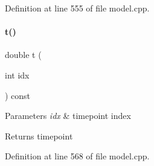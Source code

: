 Definition at line 555 of file model.\+cpp.

\mbox{\label{classamici_1_1_model_a711281d57e9710226face29151cc4641}} 
\paragraph{\texorpdfstring{t()}{t()}}
{\footnotesize\ttfamily double t (\begin{DoxyParamCaption}\item[{int}]{idx }\end{DoxyParamCaption}) const}


\begin{DoxyParams}{Parameters}
{\em idx} & timepoint index \\
\hline
\end{DoxyParams}
\begin{DoxyReturn}{Returns}
timepoint 
\end{DoxyReturn}


Definition at line 568 of file model.\+cpp.

